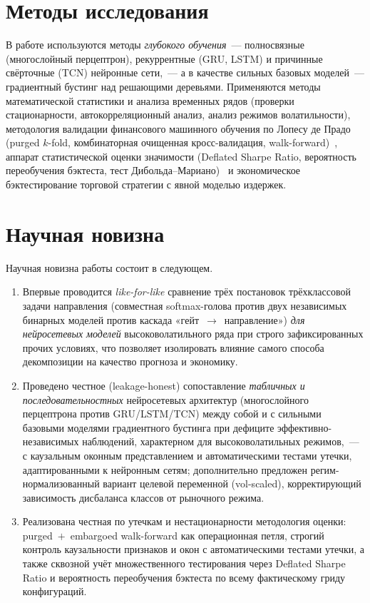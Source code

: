 \documentclass[12pt,a4paper]{report}
\begin{document}
\section*{Методы исследования}

В работе используются методы \emph{глубокого обучения}~--- полносвязные
(многослойный перцептрон), рекуррентные (GRU, LSTM) и причинные свёрточные (TCN)
нейронные сети,~--- а в качестве сильных базовых моделей~--- градиентный бустинг
над решающими деревьями. Применяются методы математической статистики и анализа
временных рядов (проверки стационарности, автокорреляционный анализ, анализ режимов
волатильности), методология валидации финансового машинного обучения по Лопесу де
Прадо (purged $k$-fold, комбинаторная очищенная кросс-валидация,
walk-forward)~\cite{lopez2018}, аппарат статистической оценки значимости (Deflated
Sharpe Ratio, вероятность переобучения бэктеста, тест
Дибольда--Мариано)~\cite{bailey2014, bailey2017, diebold1995} и экономическое
бэктестирование торговой стратегии с явной моделью
издержек.

\section*{Научная новизна}

Научная новизна работы состоит в следующем.
\begin{enumerate}[leftmargin=*]
  \item Впервые проводится \emph{like-for-like} сравнение трёх постановок
        трёхклассовой задачи направления (совместная softmax-голова против двух
        независимых бинарных моделей против каскада «гейт~$\to$~направление»)
        \emph{для нейросетевых моделей} высоковолатильного ряда при строго
        зафиксированных прочих условиях, что позволяет изолировать влияние самого
        способа декомпозиции на качество прогноза и экономику.
  \item Проведено честное (leakage-honest) сопоставление \emph{табличных и
        последовательностных} нейросетевых архитектур (многослойного перцептрона
        против GRU/LSTM/TCN) между собой и с сильными базовыми моделями
        градиентного бустинга при дефиците эффективно-независимых наблюдений,
        характерном для высоковолатильных режимов,~--- с каузальным оконным
        представлением и автоматическими тестами утечки, адаптированными к нейронным
        сетям; дополнительно предложен регим-нормализованный вариант целевой
        переменной (vol-scaled), корректирующий зависимость дисбаланса классов от
        рыночного режима.
  \item Реализована честная по утечкам и нестационарности методология оценки:
        purged~$+$~embargoed walk-forward как операционная петля, строгий контроль
        каузальности признаков и окон с автоматическими тестами утечки, а также
        сквозной учёт множественного тестирования через Deflated Sharpe Ratio и
        вероятность переобучения бэктеста по всему фактическому гриду конфигураций.
\end{enumerate}
\end{document}

